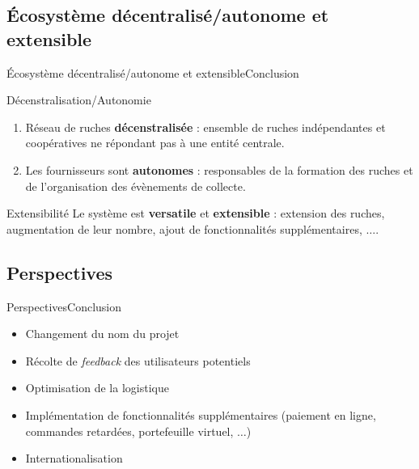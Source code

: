 \documentclass[usenames,dvipsnames]{beamer}
\begin{document}
\subsection{Écosystème décentralisé/autonome et extensible}
\begin{frame}{Écosystème décentralisé/autonome et extensible}{Conclusion}

\begin{block}{Décenstralisation/Autonomie}
\begin{enumerate}
  \item Réseau de ruches \textbf{décenstralisée} : ensemble de ruches indépendantes et coopératives ne répondant pas à une entité centrale.
  \item Les fournisseurs sont \textbf{autonomes} : responsables de la formation des ruches et de l'organisation des évènements de collecte.
\end{enumerate}
\end{block}

\begin{block}{Extensibilité}
Le système est \textbf{versatile} et \textbf{extensible} : extension des ruches, augmentation de leur nombre, ajout de fonctionnalités supplémentaires, $\dots$.
\end{block}
\end{frame}

\subsection{Perspectives}
\begin{frame}{Perspectives}{Conclusion}
 \begin{itemize}
   \item Changement du nom du projet
   \item Récolte de \textit{feedback} des utilisateurs potentiels
   \item Optimisation de la logistique
   \item Implémentation de fonctionnalités supplémentaires (paiement en ligne, commandes retardées, portefeuille virtuel, $\dots$)
   \item Internationalisation
 \end{itemize}
\end{frame}
\end{document}
